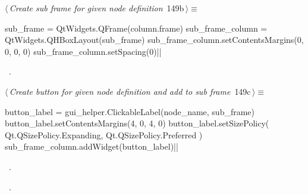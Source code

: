 \documentclass[%
    a4paper,    %
    justified,  %
    nobib,      %
    openany     %
]{tufte-book}
\begin{document}
%
\begin{flushleft} \small
\begin{minipage}{\linewidth}\label{scrap160}\raggedright\small
{} $\langle\,${\itshape Create sub frame for given node definition}\nobreak\ {\footnotesize {149b}}$\,\rangle\equiv$
\vspace{-1ex}
\begin{pythoncode}
    sub_frame = QtWidgets.QFrame(column.frame)
    sub_frame_column = QtWidgets.QHBoxLayout(sub_frame)
    sub_frame_column.setContentsMargins(0, 0, 0, 0)
    sub_frame_column.setSpacing(0)|\NWsep|
\end{pythoncode}
\vspace{1.5ex}
\footnotesize
\begin{list}{}{\setlength{\itemsep}{-\parsep}\setlength{\itemindent}{-\leftmargin}}
\item \NWtxtMacroRefIn\ .

\item{}
\end{list}
\end{minipage}\vspace{4ex}
\end{flushleft}
%
\begin{flushleft} \small
\begin{minipage}{\linewidth}\label{scrap161}\raggedright\small
{} $\langle\,${\itshape Create button for given node definition and add to sub frame}\nobreak\ {\footnotesize {149c}}$\,\rangle\equiv$
\vspace{-1ex}
\begin{pythoncode}
    button_label = gui_helper.ClickableLabel(node_name, sub_frame)
    button_label.setContentsMargins(4, 0, 4, 0)
    button_label.setSizePolicy(
        Qt.QSizePolicy.Expanding, Qt.QSizePolicy.Preferred
    )
    sub_frame_column.addWidget(button_label)|\NWsep|
\end{pythoncode}
\vspace{1.5ex}
\footnotesize
\begin{list}{}{\setlength{\itemsep}{-\parsep}\setlength{\itemindent}{-\leftmargin}}
\item \NWtxtMacroDefBy\ .
\item \NWtxtMacroRefIn\ .

\item{}
\end{list}
\end{minipage}\vspace{4ex}
\end{flushleft}
\end{document}
